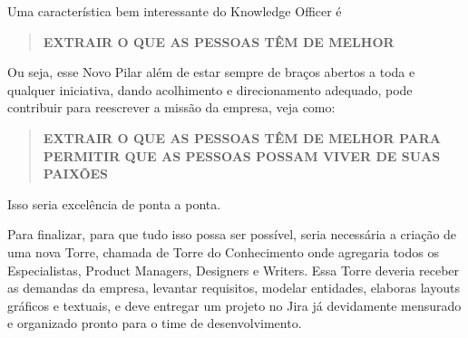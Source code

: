 Uma característica bem interessante do Knowledge Officer é
\begin{quotation}
    \textbf{EXTRAIR O QUE AS PESSOAS TÊM DE MELHOR}
\end{quotation}
Ou seja, esse Novo Pilar além de estar sempre de braços abertos a toda e qualquer iniciativa, dando acolhimento e direcionamento adequado, pode contribuir para reescrever a missão da empresa, veja como:
\begin{quotation}
    \textbf{EXTRAIR O QUE AS PESSOAS TÊM DE MELHOR PARA PERMITIR QUE AS PESSOAS POSSAM VIVER DE SUAS PAIXÕES}
\end{quotation}

Isso seria excelência de ponta a ponta.

Para finalizar, para que tudo isso possa ser possível, seria necessária a criação de uma nova Torre, chamada de Torre do Conhecimento onde agregaria todos os Especialistas, Product Managers, Designers e Writers.
Essa Torre deveria receber as demandas da empresa, levantar requisitos, modelar entidades, elaboras layouts gráficos e textuais, e deve entregar um projeto no Jira já devidamente mensurado e organizado pronto para o time de desenvolvimento.

